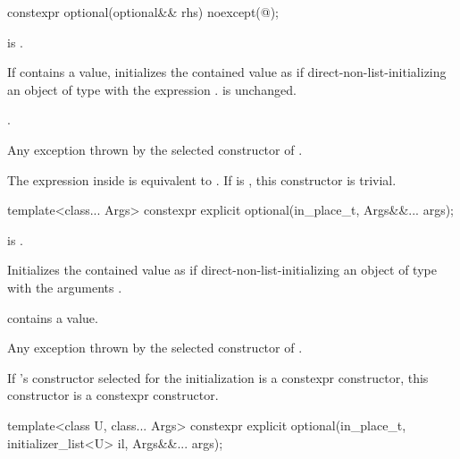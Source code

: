%
\begin{itemdecl}
constexpr optional(optional&& rhs) noexcept(@\seebelow@);
\end{itemdecl}

\begin{itemdescr}
\pnum
\constraints
{} is .

\pnum
\effects
If  contains a value, initializes the contained value as if
direct-non-list-initializing an object of type  with the expression .
 is unchanged.

\pnum
\ensures
{}.

\pnum
\throws
Any exception thrown by the selected constructor of .

\pnum
\remarks
The expression inside  is equivalent to
.
If  is ,
this constructor is trivial.
\end{itemdescr}

%
\begin{itemdecl}
template<class... Args> constexpr explicit optional(in_place_t, Args&&... args);
\end{itemdecl}

\begin{itemdescr}
\pnum
\constraints
{} is .

\pnum
\effects
Initializes the contained value as if direct-non-list-initializing an object of type  with the arguments .

\pnum
\ensures
{} contains a value.

\pnum
\throws
Any exception thrown by the selected constructor of .

\pnum
\remarks
If 's constructor selected for the initialization is a constexpr constructor, this constructor is a constexpr constructor.
\end{itemdescr}

%
\begin{itemdecl}
template<class U, class... Args>
  constexpr explicit optional(in_place_t, initializer_list<U> il, Args&&... args);
\end{itemdecl}

